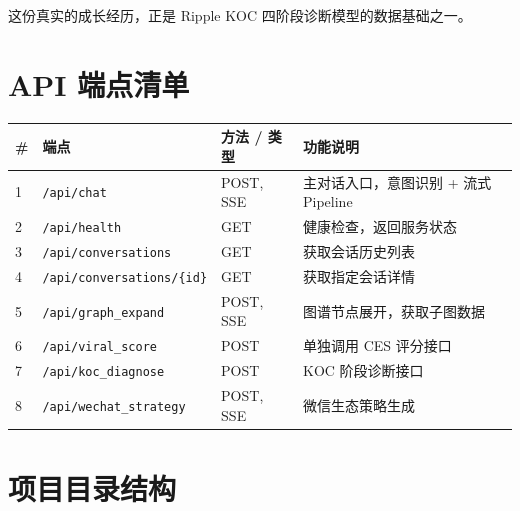 \documentclass[12pt,a4paper]{ctexart}
\begin{document}
这份真实的成长经历，正是 Ripple KOC 四阶段诊断模型的数据基础之一。


\newpage
\appendix

\section{API 端点清单}

\begin{center}
{\small
\begin{tabular}{p{1cm} p{4cm} >{\raggedright\arraybackslash}p{4cm} p{5cm}}
\toprule
\textbf{\#} & \textbf{端点} & \textbf{方法 / 类型} & \textbf{功能说明} \\
\midrule
1 & \texttt{/api/chat} & POST, SSE & 主对话入口，意图识别 + 流式 Pipeline \\[2pt]
2 & \texttt{/api/health} & GET & 健康检查，返回服务状态 \\[2pt]
3 & \texttt{/api/conversations} & GET & 获取会话历史列表 \\[2pt]
4 & \texttt{/api/conversations/\{id\}} & GET & 获取指定会话详情 \\[2pt]
5 & \texttt{/api/graph\_expand} & POST, SSE & 图谱节点展开，获取子图数据 \\[2pt]
6 & \texttt{/api/viral\_score} & POST & 单独调用 CES 评分接口 \\[2pt]
7 & \texttt{/api/koc\_diagnose} & POST & KOC 阶段诊断接口 \\[2pt]
8 & \texttt{/api/wechat\_strategy} & POST, SSE & 微信生态策略生成 \\
\bottomrule
\end{tabular}
}
\end{center}

\section{项目目录结构}
\end{document}
